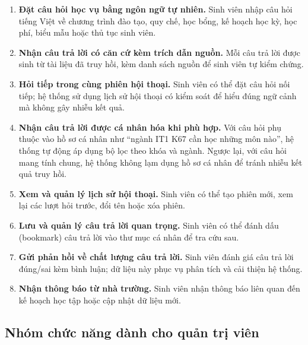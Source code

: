 \documentclass[../DoAn.tex]{subfiles}
\begin{document}
\begin{enumerate}[label=\textbf{F\arabic*.}]
    \item \textbf{Đặt câu hỏi học vụ bằng ngôn ngữ tự nhiên.} Sinh viên nhập
    câu hỏi tiếng Việt về chương trình đào tạo, quy chế, học bổng, kế hoạch
    học kỳ, học phí, biểu mẫu hoặc thủ tục sinh viên.

    \item \textbf{Nhận câu trả lời có căn cứ kèm trích dẫn nguồn.} Mỗi câu
    trả lời được sinh từ tài liệu đã truy hồi, kèm danh sách nguồn để sinh
    viên tự kiểm chứng.

    \item \textbf{Hỏi tiếp trong cùng phiên hội thoại.} Sinh viên có thể đặt
    câu hỏi nối tiếp; hệ thống sử dụng lịch sử hội thoại có kiểm soát để
    hiểu đúng ngữ cảnh mà không gây nhiễu kết quả.

    \item \textbf{Nhận câu trả lời được cá nhân hóa khi phù hợp.} Với câu
    hỏi phụ thuộc vào hồ sơ cá nhân như ``ngành IT1 K67 cần học những môn
    nào'', hệ thống tự động áp dụng bộ lọc theo khóa và ngành. Ngược lại,
    với câu hỏi mang tính chung, hệ thống không lạm dụng hồ sơ cá nhân để
    tránh nhiễu kết quả truy hồi.

    \item \textbf{Xem và quản lý lịch sử hội thoại.} Sinh viên có thể tạo
    phiên mới, xem lại các lượt hỏi trước, đổi tên hoặc xóa phiên.

    \item \textbf{Lưu và quản lý câu trả lời quan trọng.} Sinh viên có thể
    đánh dấu (bookmark) câu trả lời vào thư mục cá nhân để tra cứu sau.

    \item \textbf{Gửi phản hồi về chất lượng câu trả lời.} Sinh viên đánh
    giá câu trả lời đúng/sai kèm bình luận; dữ liệu này phục vụ phân tích
    và cải thiện hệ thống.

    \item \textbf{Nhận thông báo từ nhà trường.} Sinh viên nhận thông báo
    liên quan đến kế hoạch học tập hoặc cập nhật dữ liệu mới.
\end{enumerate}

\subsection{Nhóm chức năng dành cho quản trị viên}
\end{document}
